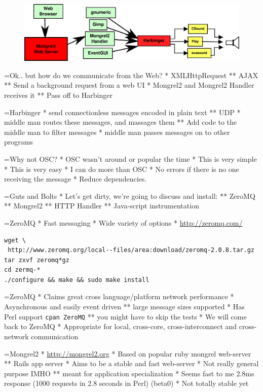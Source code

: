 \documentclass[titlepage,usenames,a4,landscape,semhelv]{seminar}
\begin{document}
\begin{slide}
\newslide

\begin{figure}
  \centering
\includegraphics[width=\textwidth]{mongrel2-example}  
\end{figure}

=Ok.. but how do we communicate from the Web?
* XMLHttpRequest
** AJAX
** Send a background request from a web UI
* Mongrel2 and Mongrel2 Handler receives it
** Pass off to Harbinger

=Harbinger
* send connectionless messages encoded in plain text
** UDP
* middle man routes these messages, and massages them
** Add code to the middle man to filter messages
* middle man passes messages on to other programs
 
=Why not OSC?
* OSC wasn't around or popular the time
* This is very simple
* This is very easy
* I can do more than OSC
* No errors if there is no one receiving the message
* Reduce dependencies.

=Guts and Bolts
* Let's get dirty, we're going to discuss and install:
** ZeroMQ
** Mongrel2
** HTTP Handler
** Java-script instrumentation

=ZeroMQ
* Fast messaging
* Wide variety of options
* \url{http://zeromq.com/}
\begin{verbatim}
wget \
 http://www.zeromq.org/local--files/area:download/zeromq-2.0.8.tar.gz
tar zxvf zeromq*gz
cd zermq-*
./configure && make && sudo make install
\end{verbatim}

=ZeroMQ
* Claims great cross language/platform network performance
* Asynchronous and easily event driven
** large message sizes supported
* Has Perl support \texttt{cpan ZeroMQ}
** you might have to skip the tests
* We will come back to ZeroMQ
* Appropriate for local, cross-core, cross-interconnect and
cross-network communication


=Mongrel2
* \url{http://mongrel2.org}
* Based on popular ruby mongrel web-server
** Rails app server
* Aims to be a stable and fast web-server
* Not really general purpose IMHO
** meant for application specialization
* Seems fast to me 2.8ms response (1000 requests in 2.8 seconds in
Perl) (beta0)
* Not totally stable yet


\end{slide}
\end{document}
